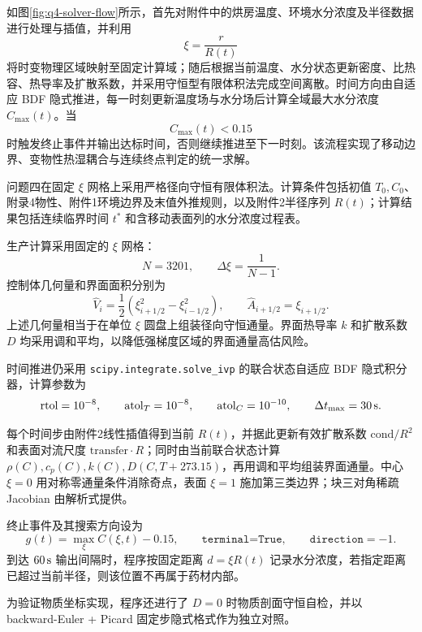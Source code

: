 \documentclass[UTF8,a4paper,12pt]{ctexart}
\begin{document}
如图\ref{fig:q4-solver-flow}所示，首先对附件中的烘房温度、环境水分浓度及半径数据进行处理与插值，并利用
\[
  \xi=\frac{r}{R(t)}
\]
将时变物理区域映射至固定计算域；随后根据当前温度、水分状态更新密度、比热容、热导率及扩散系数，并采用守恒型有限体积法完成空间离散。时间方向由自适应 BDF 隐式推进，每一时刻更新温度场与水分场后计算全域最大水分浓度 $C_{\max}(t)$。当
\[
  C_{\max}(t)<0.15
\]
时触发终止事件并输出达标时间，否则继续推进至下一时刻。该流程实现了移动边界、变物性热湿耦合与连续终点判定的统一求解。

问题四在固定 $\xi$ 网格上采用严格径向守恒有限体积法。计算条件包括初值 $T_0,C_0$、附录4物性、附件1环境边界及末值外推规则，以及附件2半径序列 $R(t)$；计算结果包括连续临界时间 $t^*$ 和含移动表面列的水分浓度过程表。

生产计算采用固定的 $\xi$ 网格：
\begin{equation}
  N=3201,\qquad \Delta\xi=\frac{1}{N-1}.
\end{equation}
控制体几何量和界面面积分别为
\begin{equation}
  \hat V_i=\frac12\left(\xi_{i+1/2}^2-\xi_{i-1/2}^2\right),\qquad
  \hat A_{i+1/2}=\xi_{i+1/2}.
\end{equation}
上述几何量相当于在单位 $\xi$ 圆盘上组装径向守恒通量。界面热导率 $k$ 和扩散系数 $D$ 均采用调和平均，以降低强梯度区域的界面通量高估风险。

时间推进仍采用 \texttt{scipy.integrate.solve\_ivp} 的联合状态自适应 BDF 隐式积分器，计算参数为
\begin{equation}
  \mathrm{rtol}=10^{-8},\qquad
  \mathrm{atol}_T=10^{-8},\qquad
  \mathrm{atol}_C=10^{-10},\qquad
  \Delta t_{\max}=30\rm\,s.
\end{equation}

每个时间步由附件2线性插值得到当前 $R(t)$，并据此更新有效扩散系数 $\mathrm{cond}/R^2$ 和表面对流尺度 $\mathrm{transfer}\cdot R$；同时由当前联合状态计算 $\rho(C),c_p(C),k(C),D(C,T+273.15)$，再用调和平均组装界面通量。中心 $\xi=0$ 用对称零通量条件消除奇点，表面 $\xi=1$ 施加第三类边界；块三对角稀疏 Jacobian 由解析式提供。

终止事件及其搜索方向设为
\begin{equation}
  g(t)=\max_\xi C(\xi,t)-0.15,\qquad
  \texttt{terminal=True},\qquad \texttt{direction}=-1.
\end{equation}
到达 $60\rm\,s$ 输出间隔时，程序按固定距离 $d=\xi R(t)$ 记录水分浓度，若指定距离已超过当前半径，则该位置不再属于药材内部。

为验证物质坐标实现，程序还进行了 $D=0$ 时物质剖面守恒自检，并以 backward-Euler + Picard 固定步隐式格式作为独立对照。
\end{document}
